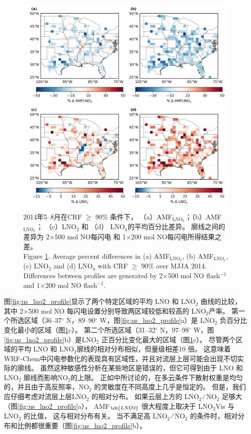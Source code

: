 \begin{figure}[!htbp]
\centering
\includegraphics[width=13cm]{./figures/us_simulation_diff.png}
\caption{2014年5--8月在CRF $\geq$ 90\% 条件下，
（a）AMF$_{\textrm{LNO$_2$}}$；（b）AMF$_{\textrm{LNO$_x$}}$；
（c）LNO$_\textrm{2}$ 和 （d） LNO$_\textrm{x}$的平均百分比差异。
廓线之间的差异为 2$\times$500 mol NO每闪电 和 1$\times$200 mol NO每闪电所得结果之差。\\
Figure \ref{fig:us_simulation_diff}. Average percent differences in (a) AMF$_{\textrm{LNO$_2$}}$, (b) AMF$_{\textrm{LNO$_x$}}$, (c) LNO$_\textrm{2}$ and (d) LNO$_\textrm{x}$ with CRF $\geq$ 90\% over MJJA 2014.
Differences between profiles are generated by 2$\times$500 mol NO flash$^{-1}$ and 1$\times$200 mol NO flash$^{-1}$.}
\label{fig:us_simulation_diff}
\end{figure}

图\ref{fig:us_lno2_profile}显示了两个特定区域的平均 LNO 和 LNO$_2$ 曲线的比较，
其中 2$\times$500 mol NO 每闪电设置分别导致两区域较低和较高的 LNO$_2$产率。
第一个所选区域（36--37$^{\circ}$ N，89--90$^{\circ}$ W，图\ref{fig:us_lno2_profile}a）是 LNO$_2$ 负百分比变化最小的区域（图\ref{fig:us_simulation_diff}c）。
第二个所选区域（31--32$^{\circ}$ N，97--98$^{\circ}$ W，图\ref{fig:us_lno2_profile}b）是LNO$_2$ 正百分比变化最大的区域（图\ref{fig:us_simulation_diff}c）。
尽管两个区域的平均 LNO 和 LNO$_2$廓线的相对分布相似，但量级相差10 倍。
这意味着 WRF-Chem中闪电参数化的表现具有区域性，并且对流层上层可能会出现不切实际的廓线。
虽然这种敏感性分析在某些地区是错误的，但它可得到由于 LNO 和 LNO$_2$ 廓线而影响NO$_2$的上限。
正如\citet{Laughner.2017}中所讨论的，在多云条件下散射权重是均匀的，并且由于高反照率，NO$_2$ 的灵敏度在不同高度上几乎是恒定的。
但是，我们应仔细考虑对流层上层LNO$_2$ 的相对分布。
如果云层上方的 LNO$_2$ ∕ NO$_2$ 足够大（图\ref{fig:us_lno2_profile}a），
AMF$_{\ch{LNO2}}$ 很大程度上取决于 LNO$_2$Vis 与 LNO$_2$ 的比值，
这与相对分布有关。
当不满足高 LNO$_2$ ∕ NO$_2$ 的条件时，相对分布和比例都很重要（图\ref{fig:us_lno2_profile}b）。

